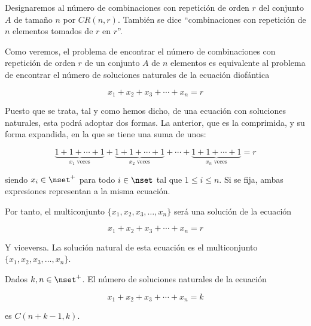 Designaremos al número de combinaciones con repetición de orden $r$ del
conjunto $A$ de tamaño $n$ por $CR(n, r)$. También se dice ``combinaciones
con repetición de $n$ elementos tomados de $r$ en $r$''.

Como veremos, el problema de encontrar el número de combinaciones con
repetición de orden $r$ de un conjunto $A$ de $n$ elementos es equivalente
al problema de encontrar el número de soluciones naturales de la ecuación
diofántica

$$ x_1 + x_2 + x_3 + \cdots + x_n = r $$

\noindent Puesto que se trata, tal y como hemos dicho, de una ecuación con
soluciones naturales, esta podrá adoptar dos formas. La anterior, que es la
comprimida, y su forma expandida, en la que se tiene una suma de unos:

$$ \underbrace{1 + 1 + \cdots + 1}_\text{$x_1$ veces} + \underbrace{1 + 1 +
\cdots + 1}_\text{$x_2$ veces} + \cdots + \underbrace{1 + 1 + \cdots +
1}_\text{$x_n$ veces} = r $$

\noindent siendo $x_i \in \nset^{+}$ para todo $i \in \nset$ tal que $1 \leq
i \leq n$. Si se fija, ambas expresiones representan a la misma ecuación.

Por tanto, el multiconjunto $\{x_1, x_2, x_3, \ldots, x_n\}$ será una
solución de la ecuación

$$ x_1 + x_2 + x_3 + \cdots + x_n = r $$

\noindent Y viceversa. La solución natural de esta ecuación es el
multiconjunto $\{x_1, x_2, x_3, \ldots, x_n\}$.

\begin{theorem}
  Dados $k, n \in \nset^{+}$. El número de soluciones naturales de la
  ecuación

  $$ x_1 + x_2 + x_3 + \cdots + x_n = k $$

  \noindent es $C(n + k - 1, k)$.
\end{theorem}

